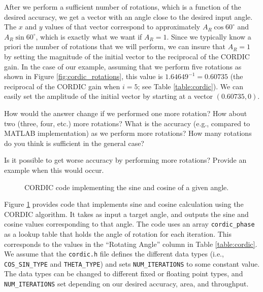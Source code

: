 After we perform a sufficient number of rotations, which is a function of the desired accuracy, we get a vector with an angle close to the desired input angle. The $x$ and $y$ values of that vector correspond to approximately $A_R \cos 60^{\circ}$ and $A_R \sin 60^{\circ}$, which is exactly what we want if $A_R = 1$. Since we typically know a priori the number of rotations that we will perform, we can insure that $A_R = 1$ by setting the magnitude of the initial vector to the reciprocal of the CORDIC gain. In the case of our example, assuming that we perform five rotations as shown in Figure \ref{fig:cordic_rotations}, this value is $1.64649^{-1} = 0.60735$ (the reciprocal of the CORDIC gain when $i=5$; see Table \ref{table:cordic}). We can easily set the amplitude of the initial vector by starting at a vector $(0.60735, 0)$. 

\begin{exercise}
How would the answer change if we performed one more rotation? How about two (three, four, etc.) more rotations? What is the accuracy (e.g., compared to MATLAB implementation) as we perform more rotations? How many rotations do you think is sufficient in the general case?
\end{exercise}


\begin{exercise}
Is it possible to get worse accuracy by performing more rotations? Provide an example when this would occur.
\end{exercise}

\begin{figure}

\caption{CORDIC code implementing the sine and cosine of a given angle.}
\label{fig:cordic_code}
\end{figure}

Figure \ref{fig:cordic_code} provides code that implements sine and cosine calculation using the CORDIC algorithm. It takes as input a target angle, and outputs the sine and cosine values corresponding to that angle. The code uses an array \lstinline{cordic_phase} as a lookup table that holds the angle of rotation for each iteration. This corresponds to the values in the ``Rotating Angle'' column in Table \ref{table:cordic}. We assume that the \lstinline{cordic.h} file defines the different data types (i.e., \lstinline{COS_SIN_TYPE} and \lstinline{THETA_TYPE}) and sets \lstinline{NUM_ITERATIONS} to some constant value. The data types can be changed to different fixed or floating point types, and \lstinline{NUM_ITERATIONS} set depending on our desired accuracy, area, and throughput. 

